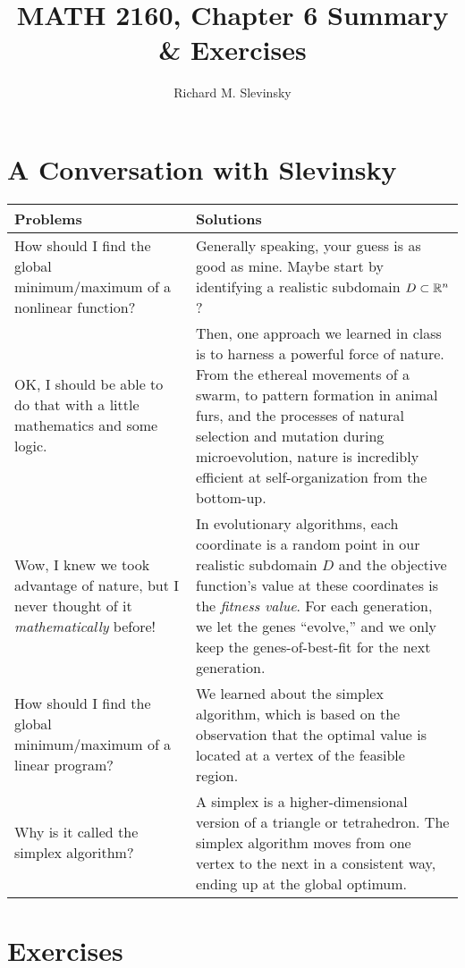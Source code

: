 \documentclass[11pt,letterpaper]{article}
\begin{document}
\title{MATH 2160, Chapter 6 Summary \& Exercises}
\author{Richard M. Slevinsky}
\date{}
\maketitle

\section*{A Conversation with Slevinsky}

\begin{longtable}{p{}|p{}}
\hline
Problems & Solutions\\
\hline
How should I find the global minimum/maximum of a nonlinear function? & Generally speaking, your guess is as good as mine. Maybe start by identifying a realistic subdomain $D\subset\mathbb{R}^n$?\\
OK, I should be able to do that with a little mathematics and some logic. & Then, one approach we learned in class is to harness a powerful force of nature. From the ethereal movements of a swarm, to pattern formation in animal furs, and the processes of natural selection and mutation during microevolution, nature is incredibly efficient at self-organization from the bottom-up.\\
Wow, I knew we took advantage of nature, but I never thought of it {\em mathematically} before! & In evolutionary algorithms, each coordinate is a random point in our realistic subdomain $D$ and the objective function's value at these coordinates is the {\em fitness value}. For each generation, we let the genes ``evolve,'' and we only keep the genes-of-best-fit for the next generation.\\
\hline
How should I find the global minimum/maximum of a linear program? & We learned about the simplex algorithm, which is based on the observation that the optimal value is located at a vertex of the feasible region.\\
Why is it called the simplex algorithm? & A simplex is a higher-dimensional version of a triangle or tetrahedron. The simplex algorithm moves from one vertex to the next in a consistent way, ending up at the global optimum.\\
\hline
\end{longtable}

\section*{Exercises}
\end{document}
